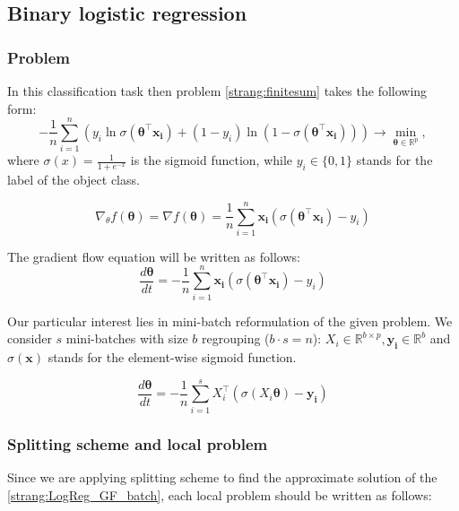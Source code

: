 \documentclass{article}
\newcommand{\vect}[1]{\boldsymbol{\mathbf{#1}}}
\begin{document}
\subsection{Binary logistic regression}
\subsubsection{Problem}
In this classification task then problem \eqref{strang:finitesum} takes the following form:
\begin{equation}\label{strang:LogReg}
-\frac{1}{n} \sum_{i=1}^n\left(y_i \ln \sigma(\vect{\theta}^\top\vect{x_i})  + (1-y_i) \ln (1-\sigma(\vect{\theta}^\top\vect{x_i}))\right) \to \min_{\vect{\theta} \in \mathbb{R}^p},
\end{equation}
where $\sigma(x) = \frac{1}{1 + e^{-x}}$ is the sigmoid function, while $ y_i \in \{0,1\}$ stands for the label of the object class.

\begin{equation}\label{strang:LogReg_grad}
\nabla_\theta f(\vect{\theta}) = \nabla f(\vect{\theta}) = \frac{1}{n}\sum\limits_{i=1}^n \vect{x_i}(\sigma(\vect{\theta}^\top\vect{x_i}) - y_i)
\end{equation}

The gradient flow equation will be written as follows:
\begin{equation}\label{strang:LogReg_GF}
\frac{d \vect{\theta}}{d t} = - \frac{1}{n}\sum\limits_{i=1}^n \vect{x_i}(\sigma(\vect{\theta}^\top\vect{x_i}) - y_i)
\end{equation}

Our particular interest lies in mini-batch reformulation of the given problem. We consider $s$ mini-batches with size $b$ regrouping ($b \cdot s = n$): $X_i \in \mathbb{R}^{b \times p}, \vect{y_i} \in \mathbb{R}^{b}$ and  $\sigma(\vect{x})$ stands for the element-wise sigmoid function.

\begin{equation}\label{strang:LogReg_GF_batch}
\frac{d \vect{\theta}}{d t} = - \frac{1}{n}\sum\limits_{i=1}^s X_i^\top\left(\sigma\left(X_i\vect{\theta}\right) - \vect{y_i}\right)
\end{equation}

\subsubsection{Splitting scheme and local problem}

Since we are applying splitting scheme to find the approximate solution of the \eqref{strang:LogReg_GF_batch}, each local problem should be written as follows:
\end{document}
